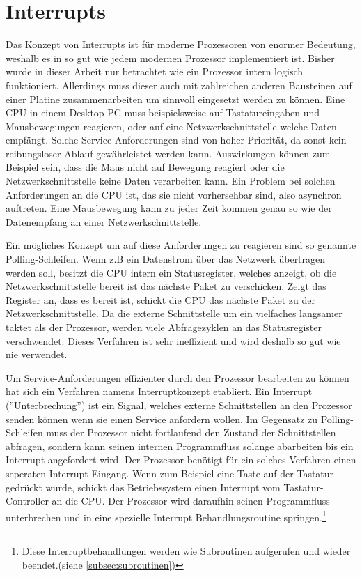 \documentclass[12pt]{article}
\begin{document}
\section{Interrupts}
Das Konzept von Interrupts ist für moderne Prozessoren von enormer Bedeutung, weshalb es in so gut wie jedem modernen Prozessor implementiert ist. Bisher wurde in dieser Arbeit nur betrachtet wie ein Prozessor intern logisch funktioniert. Allerdings muss dieser auch mit zahlreichen anderen Bausteinen auf einer Platine zusammenarbeiten um sinnvoll eingesetzt werden zu können. Eine CPU in einem Desktop PC muss beispielsweise auf Tastatureingaben und Mausbewegungen reagieren, oder auf eine Netzwerkschnittstelle welche Daten empfängt. Solche Service-Anforderungen sind von hoher Priorität, da sonst kein reibungsloser Ablauf gewährleistet werden kann. Auswirkungen können zum Beispiel sein, dass die Maus nicht auf Bewegung reagiert oder die Netzwerkschnittstelle keine Daten verarbeiten kann. Ein Problem bei solchen Anforderungen an die CPU ist, das sie nicht vorhersehbar sind, also asynchron auftreten. Eine Mausbewegung kann zu jeder Zeit kommen genau so wie der Datenempfang an einer Netzwerkschnittstelle. \cite[S.112ff]{mikroprozessortechnik2011}
\par\bigskip
\noindent Ein mögliches Konzept um auf diese Anforderungen zu reagieren sind so genannte Polling-Schleifen. Wenn z.B ein Datenstrom über das Netzwerk übertragen werden soll, besitzt die CPU intern ein Statusregister, welches anzeigt, ob die Netzwerkschnittstelle bereit ist das nächste Paket zu verschicken. Zeigt das Register an, dass es bereit ist, schickt die CPU das nächste Paket zu der Netzwerkschnittstelle. Da die externe Schnittstelle um ein vielfaches langsamer taktet als der Prozessor, werden viele Abfragezyklen an das Statusregister verschwendet. Dieses Verfahren ist sehr ineffizient und wird deshalb so gut wie nie verwendet. \cite{mikroprozessortechnik2011}
\par 
\noindent Um Service-Anforderungen effizienter durch den Prozessor bearbeiten zu können hat sich ein Verfahren namens Interruptkonzept etabliert. Ein Interrupt (''Unterbrechung'') ist ein Signal, welches externe Schnittstellen an den Prozessor senden können wenn sie einen Service anfordern wollen. Im Gegensatz zu Polling-Schleifen muss der Prozessor nicht fortlaufend den Zustand der Schnittstellen abfragen, sondern kann seinen internen Programmfluss solange abarbeiten bis ein Interrupt angefordert wird. Der Prozessor benötigt für ein solches Verfahren einen seperaten Interrupt-Eingang. Wenn zum Beispiel eine Taste auf der Tastatur gedrückt wurde, schickt das Betriebssystem einen Interrupt vom Tastatur-Controller an die CPU. Der Prozessor wird daraufhin seinen Programmfluss unterbrechen und in eine spezielle Interrupt Behandlungsroutine springen.\footnote{Diese Interruptbehandlungen werden wie Subroutinen aufgerufen und wieder beendet.(siehe \ref{subsec:subroutinen})}
\end{document}
